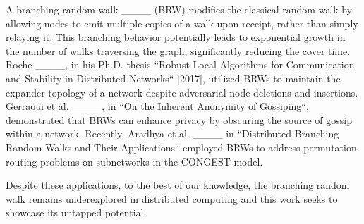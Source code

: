     A branching random walk ____ (BRW) modifies the classical random walk by allowing nodes to emit multiple copies of a walk upon receipt, rather than simply relaying it. This branching behavior potentially leads to exponential growth in the number of walks traversing the graph, significantly reducing the cover time. Roche ____, in his Ph.D. thesis ``Robust Local Algorithms for Communication and Stability in Distributed Networks`` [2017], utilized BRWs to maintain the expander topology of a network despite adversarial node deletions and insertions. Gerraoui et al. ____, in ``On the Inherent Anonymity of Gossiping``, demonstrated that BRWs can enhance privacy by obscuring the source of gossip within a network. Recently, Aradhya et al. ____ in ``Distributed Branching Random Walks and Their Applications`` employed BRWs to address permutation routing problems on subnetworks in the CONGEST model.

    Despite these applications, to the best of our knowledge, the branching random walk remains underexplored in distributed computing and this work seeks to showcase its untapped potential.